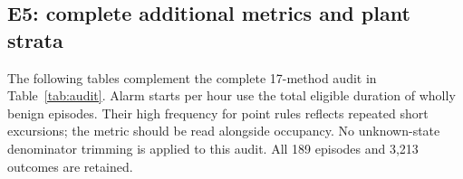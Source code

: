 \subsection{E5: complete additional metrics and plant strata}
The following tables complement the complete 17-method audit in Table~\ref{tab:audit}. Alarm starts per hour use the total eligible duration of wholly benign episodes. Their high frequency for point rules reflects repeated short excursions; the metric should be read alongside occupancy. No unknown-state denominator trimming is applied to this audit. All 189 episodes and 3,213 outcomes are retained.
\begin{table}[t]\centering
\caption{Final audit: unadjusted point precision/recall, benign occupancy, alarm starts per benign hour and missed events.}

\end{table}
\begin{table}[t]\centering
\caption{Primary base-dual versus RBF-dual comparison by plant. Every plant has 29,700 benign points and 36 attack events.}
\setlength{\tabcolsep}{4pt}
\end{table}
